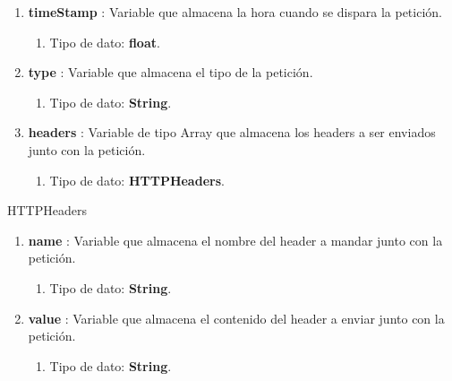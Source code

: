 \documentclass[12pt, a4paper, titlepage]{report}
\begin{document}
\begin{enumerate}
\begin{enumerate}
    		        \end{enumerate}
    		        \item \textbf{timeStamp} : Variable que almacena la hora cuando se dispara la petición.
    		        \begin{enumerate}
    		            \item Tipo de dato: \textbf{float}.
    		        \end{enumerate}
    		        \item \textbf{type} : Variable que almacena el tipo de la petición.
    		        \begin{enumerate}
    		            \item Tipo de dato: \textbf{String}.
    		        \end{enumerate}
    		        \item \textbf{headers} : Variable de tipo Array que almacena los headers a ser enviados junto con la petición.
    		        \begin{enumerate}
    		            \item Tipo de dato: \textbf{HTTPHeaders}.
    		        \end{enumerate}
			    \end{enumerate}
			    
			    \large HTTPHeaders
			    \begin{enumerate}
    		        \item \textbf{name} : Variable que almacena el nombre del header a mandar junto con la petición.
    		        \begin{enumerate}
    		            \item Tipo de dato: \textbf{String}.
    		        \end{enumerate}
    		        \item \textbf{value} : Variable que almacena el contenido del header a enviar junto con la petición.
    		        \begin{enumerate}
    		            \item Tipo de dato: \textbf{String}.
    		        \end{enumerate}
			    \end{enumerate}
		    
		    
			    
\end{document}
